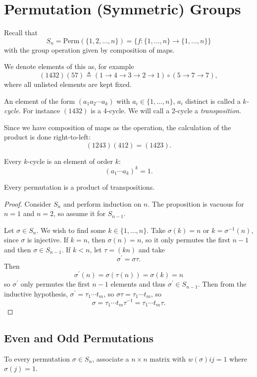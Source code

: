 \section{Permutation (Symmetric) Groups}
Recall that
$$
  S_n
= \mathrm{Perm}(\{1, 2, \dots, n\})
= \{ f : \{ 1, \dots, n \} \to \{ 1, \dots, n \} \}
$$
with the group operation given by composition of maps.

We denote elements of this as, for example
$$
  (1432)(57)
\triangleq
  (1 \to 4 \to 3 \to 2 \to 1) \circ (5 \to 7 \to 7),
$$
where all unlisted elements are kept fixed.

\begin{defn}
An element of the form $(a_1 a_2 \cdots a_k)$ with
$a_i \in \{ 1, \dots, n \}$, $a_i$ distinct is called a
\emph{$k$-cycle}.
For instance $(1432)$ is a 4-cycle. We will call a 2-cycle
a \emph{transposition}.
\end{defn}

Since we have composition of maps as the operation, the calculation of
the product is done right-to-left:
$$
(1243)(412) = (1423).
$$

\begin{remark}
Every $k$-cycle is an element of order $k$:
$$
(a_1 \cdots a_k)^k = 1.
$$
\end{remark}

\begin{prop}
Every permutation is a product of transpositions.
\end{prop}
\begin{proof}
Consider $S_n$ and perform induction on $n$. The proposition is
vacuous for $n = 1$ and $n = 2$, so assume it for $S_{n-1}$.

Let $\sigma \in S_n$. We wish to find some $k \in \{1, \dots, n\}$.
Take $\sigma(k) = n$ or $k = \sigma^{-1}(n)$, since $\sigma$ is
injective. If $k = n$, then $\sigma(n) = n$, so it only permutes the
first $n-1$ and then
$\sigma \in S_{n-1}$. If $k < n$, let $\tau = (kn)$ and take
$$
\sigma^\prime = \sigma \tau.
$$
Then
$$
  \sigma^\prime(n)
= \sigma (\tau(n))
= \sigma(k)
= n
$$
so
$\sigma^\prime$ only permutes the first $n-1$ elements and thus
$\sigma^\prime \in S_{n-1}$. Then from the inductive hypothesis,
$\sigma^\prime = \tau_1 \cdots t_m$,
so $\sigma \tau = \tau_1 \cdots t_m$,
so
$$
\sigma
= \tau_1 \cdots t_m \tau^{-1}
= \tau_1 \cdots t_m \tau.
$$
\end{proof}

\subsection*{Even and Odd Permutations}
To every permutation $\sigma \in S_n$, associate a $n \times n$ matrix
with $w(\sigma){ij} = 1$ where $\sigma(j) = 1$.

